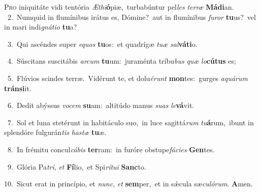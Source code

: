 \lettrine{\initial\textcolor{\initialcolor}{P}}{ro} iniquitáte vidi tentória \textit{Æ}\-\textit{thi}\textbf{ó}piæ,~\star turbabúntur pel\textit{les} \textit{ter}\-\textit{ræ} \textbf{Má}\-\textbf{di}an.\\
{\numbfont\textcolor{\numbcolor}{~2.}}~Numquid in flumínibus irátus es, Dómine?~\dagger aut in flumínibus \textit{fu}\-\textit{ror} \textbf{tu}\-us?~\star vel in mari indi\-\textit{gná}\-\textit{ti}\textit{o} \textbf{tu}\-a?\par
{\numbfont\textcolor{\numbcolor}{~3.}}~Qui ascéndes super \textit{e}\-\textit{quos} \textbf{tu}\-os:~\star et quadrígæ \textit{tu}\-\textit{æ} \textit{sal}\-\textbf{vá}\textbf{ti}o.\par
{\numbfont\textcolor{\numbcolor}{~4.}}~Súscitans suscitábis \textit{ar}\-\textit{cum} \textbf{tu}\-um:~\star juraménta tríbu\textit{bus} \textit{quæ} \textit{lo}\-\textbf{cú}\textbf{tus} es;\par
{\numbfont\textcolor{\numbcolor}{~5.}}~Flúvios scindes terræ.~\dagger Vidérunt te, et dolu\-\textit{é}\-\textit{runt} \textbf{mon}\-tes:~\star gurges \textit{a}\-\textit{quá}\textit{rum} \textbf{tráns}\-\textbf{i}it.\par
{\numbfont\textcolor{\numbcolor}{~6.}}~Dedit abýssus \textit{vo}\-\textit{cem} \textbf{su}\-am:~\star altitúdo manus \textit{su}\-\textit{as} \textit{le}\-\textbf{vá}vit.\par
{\numbfont\textcolor{\numbcolor}{~7.}}~Sol et luna stetérunt in habitáculo suo,~\dagger in luce sagittá\textit{rum} \textit{tu}\-\textbf{á}rum,~\star ibunt in splendóre fulgurán\textit{tis} \textit{has}\-\textit{tæ} \textbf{tu}\-æ.\par
{\numbfont\textcolor{\numbcolor}{~8.}}~In frémitu concul\-\textit{cá}\-\textit{bis} \textbf{ter}\-ram:~\star in furóre obstupe\-\textit{fá}\-\textit{ci}\textit{es} \textbf{Gen}\-tes.\par
{\numbfont\textcolor{\numbcolor}{~9.}}~Glória Pa\-\textit{tri}\-, \textit{et} \textbf{Fí}\-lio,~\star et Spi\-\textit{rí}\-\textit{tu}\textit{i} \textbf{Sanc}\-to.\par
{\numbfont\textcolor{\numbcolor}{10.}}~Sicut erat in princípio, et \textit{nunc}\-, \textit{et} \textbf{sem}\-per,~\star et in sǽcula sæ\-\textit{cu}\-\textit{ló}\textit{rum}. \textbf{A}\-men.\par
